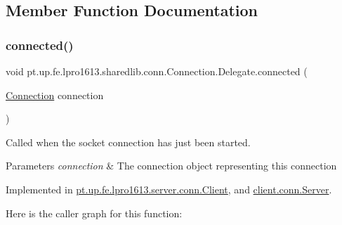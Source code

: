 \subsection{Member Function Documentation}
\hypertarget{interfacept_1_1up_1_1fe_1_1lpro1613_1_1sharedlib_1_1conn_1_1_connection_1_1_delegate_afeb3c54ced46916733df2ba0b0e2d87e}{}\label{interfacept_1_1up_1_1fe_1_1lpro1613_1_1sharedlib_1_1conn_1_1_connection_1_1_delegate_afeb3c54ced46916733df2ba0b0e2d87e} 
\subsubsection{\texorpdfstring{connected()}{connected()}}
{\footnotesize\ttfamily void pt.\+up.\+fe.\+lpro1613.\+sharedlib.\+conn.\+Connection.\+Delegate.\+connected (\begin{DoxyParamCaption}\item[{\hyperlink{classpt_1_1up_1_1fe_1_1lpro1613_1_1sharedlib_1_1conn_1_1_connection}{Connection}}]{connection }\end{DoxyParamCaption})}

Called when the socket connection has just been started.


\begin{DoxyParams}{Parameters}
{\em connection} & The connection object representing this connection \\
\hline
\end{DoxyParams}


Implemented in \hyperlink{classpt_1_1up_1_1fe_1_1lpro1613_1_1server_1_1conn_1_1_client_a1cf160e68d7310d9f0b3a53d8b26f80d}{pt.\+up.\+fe.\+lpro1613.\+server.\+conn.\+Client}, and \hyperlink{classclient_1_1conn_1_1_server_ac8ad09c9052bfb32e082493ada8d14ab}{client.\+conn.\+Server}.

Here is the caller graph for this function\+:
\hypertarget{interfacept_1_1up_1_1fe_1_1lpro1613_1_1sharedlib_1_1conn_1_1_connection_1_1_delegate_a39547a28a5b1818ca952e8d3d8da15ba}{}\label{interfacept_1_1up_1_1fe_1_1lpro1613_1_1sharedlib_1_1conn_1_1_connection_1_1_delegate_a39547a28a5b1818ca952e8d3d8da15ba} 
